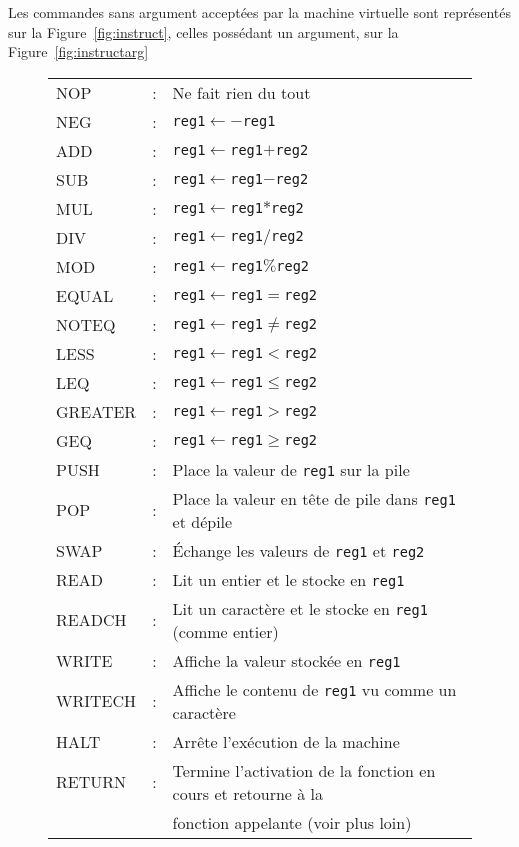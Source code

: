 \documentclass[12pt,a4paper]{article}
\begin{document}
Les commandes sans argument acceptées par la machine virtuelle sont
représentés sur la Figure~\ref{fig:instruct}, celles possédant un
argument, sur la Figure~\ref{fig:instructarg}

\begin{figure}
  \centering
  \begin{tabular}{lll}
    NOP   &:& Ne fait rien du tout\\
    NEG   &:& {\tt reg1}$\leftarrow-${\tt reg1}\\
    ADD   &:& {\tt reg1}$\leftarrow${\tt reg1}$+${\tt reg2}\\
    SUB   &:& {\tt reg1}$\leftarrow${\tt reg1}$-${\tt reg2}\\
    MUL   &:& {\tt reg1}$\leftarrow${\tt reg1}$*${\tt reg2}\\
    DIV   &:& {\tt reg1}$\leftarrow${\tt reg1}$/${\tt reg2}\\
    MOD   &:& {\tt reg1}$\leftarrow${\tt reg1}$\%${\tt reg2}\\
    EQUAL &:& {\tt reg1}$\leftarrow${\tt reg1}$=${\tt reg2}\\
    NOTEQ &:& {\tt reg1}$\leftarrow${\tt reg1}$\neq${\tt reg2}\\
    LESS  &:& {\tt reg1}$\leftarrow${\tt reg1}$<${\tt reg2}\\
    LEQ   &:& {\tt reg1}$\leftarrow${\tt reg1}$\leqslant${\tt reg2}\\
    GREATER &:& {\tt reg1}$\leftarrow${\tt reg1}$>${\tt reg2}\\
    GEQ   &:& {\tt reg1}$\leftarrow${\tt reg1}$\geqslant${\tt reg2}\\
    PUSH  &:& Place la valeur de {\tt reg1} sur la pile\\
    POP   &:& Place la valeur en tête de pile dans {\tt reg1} et dépile\\
    SWAP  &:& Échange les valeurs de {\tt reg1} et {\tt reg2}\\
    READ  &:& Lit un entier et le stocke en {\tt reg1}\\
    READCH  &:& Lit un caractère et le stocke en {\tt reg1} (comme entier)\\
    WRITE &:& Affiche la valeur stockée en {\tt reg1}\\
    WRITECH &:& Affiche le contenu de {\tt reg1} vu comme un caractère\\
    HALT  &:& Arrête l'exécution de la machine\\
    RETURN&:& Termine l'activation de la fonction en cours
    et retourne à la\\&& fonction appelante (voir plus loin)\\

\end{tabular}
\end{figure}
\end{document}
